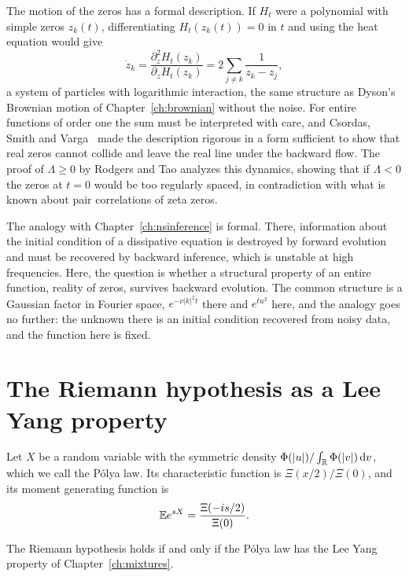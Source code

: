 The motion of the zeros has a formal description. If $H_t$ were a polynomial with simple zeros $z_k(t)$, differentiating $H_t(z_k(t)) = 0$ in $t$ and using the heat equation would give
\[
\dot z_k = \frac{\partial_z^2H_t(z_k)}{\partial_zH_t(z_k)} = 2\sum_{j\neq k}\frac{1}{z_k-z_j},
\]
a system of particles with logarithmic interaction, the same structure as Dyson's Brownian motion of Chapter~\ref{ch:brownian} without the noise. For entire functions of order one the sum must be interpreted with care, and Csordas, Smith and Varga~\cite{csv1994} made the description rigorous in a form sufficient to show that real zeros cannot collide and leave the real line under the backward flow. The proof of $\Lambda\geq0$ by Rodgers and Tao analyzes this dynamics, showing that if $\Lambda<0$ the zeros at $t = 0$ would be too regularly spaced, in contradiction with what is known about pair correlations of zeta zeros.

The analogy with Chapter~\ref{ch:nsinference} is formal. There, information about the initial condition of a dissipative equation is destroyed by forward evolution and must be recovered by backward inference, which is unstable at high frequencies. Here, the question is whether a structural property of an entire function, reality of zeros, survives backward evolution. The common structure is a Gaussian factor in Fourier space, $e^{-\nu|k|^2t}$ there and $e^{tu^2}$ here, and the analogy goes no further: the unknown there is an initial condition recovered from noisy data, and the function here is fixed.

\section{The Riemann hypothesis as a Lee Yang property}\label{sec:leeyangrh}

Let $X$ be a random variable with the symmetric density $\Phi(|u|)/\int_{\mathbb{R}}\Phi(|v|)\,\mathrm{d} v$, which we call the P\'olya law. Its characteristic function is $\Xi(x/2)/\Xi(0)$, and its moment generating function is
\[
\mathbb{E} e^{sX} = \frac{\Xi(-is/2)}{\Xi(0)}.
\]
\begin{proposition}\label{prop:polyaleeyang}
The Riemann hypothesis holds if and only if the P\'olya law has the Lee Yang property of Chapter~\ref{ch:mixtures}.
\end{proposition}

